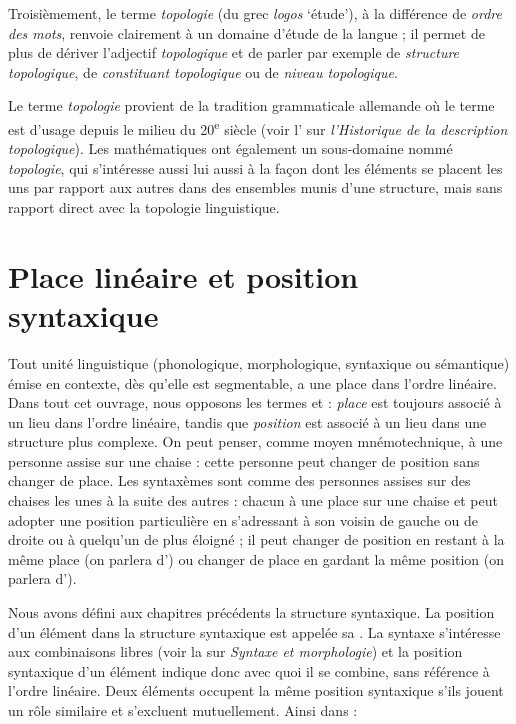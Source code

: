 Troisièmement, le terme \textit{topologie} (du grec \textit{logos} ‘étude’), à la différence de \textit{ordre des mots}, renvoie clairement à un domaine d’étude de la langue ; il permet de plus de dériver l’adjectif \textit{topologique} et de parler par exemple de \textit{structure topologique}, de \textit{constituant topologique} ou de \textit{niveau topologique}.

Le terme \textit{topologie} provient de la tradition grammaticale allemande où le terme est d’usage depuis le milieu du 20\textsuperscript{e} siècle (voir l' sur \textit{l’Historique de la description topologique}). Les mathématiques ont également un sous-domaine nommé \textit{topologie}, qui s'intéresse aussi lui aussi à la façon dont les éléments se placent les uns par rapport aux autres dans des ensembles munis d’une structure, mais sans rapport direct avec la topologie linguistique.

\section{Place linéaire et position syntaxique}\label{sec:3.5.3}

Tout unité linguistique (phonologique, morphologique, syntaxique ou sémantique) émise en contexte, dès qu’elle est segmentable, a une place dans l’ordre linéaire. Dans tout cet ouvrage, nous opposons les termes  et  : \textit{place} est toujours associé à un lieu dans l’ordre linéaire, tandis que \textit{position} est associé à un lieu dans une structure plus complexe. On peut penser, comme moyen mnémotechnique, à une personne assise sur une chaise : cette personne peut changer de position sans changer de place. Les syntaxèmes sont comme des personnes assises sur des chaises les unes à la suite des autres : chacun à une place sur une chaise et peut adopter une position particulière en s'adressant à son voisin de gauche ou de droite ou à quelqu'un de plus éloigné ; il peut changer de position en restant à la même place (on parlera d’) ou changer de place en gardant la même position (on parlera d’).

Nous avons défini aux chapitres précédents la structure syntaxique. La position d’un élément dans la structure syntaxique est appelée sa . La syntaxe s’intéresse aux combinaisons libres (voir la  sur \textit{Syntaxe et morphologie}) et la position syntaxique d’un élément indique donc avec quoi il se combine, sans référence à l’ordre linéaire. Deux éléments occupent la même position syntaxique s’ils jouent un rôle similaire et s’excluent mutuellement. Ainsi dans :

